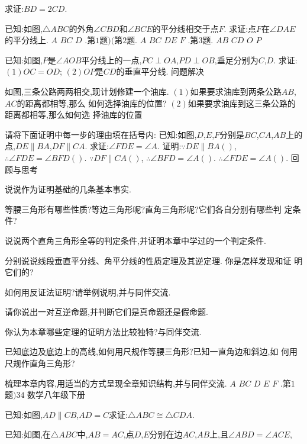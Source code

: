 \documentclass[cn,blue,12pt]{elegantbook}
\begin{document}
\begin{liti}[resume]
求证:\( BD = 2CD\). 
\item 已知:如图,\( \triangle ABC \)的外角\( \angle  CBD \)和\( \angle  BCE \)的平分线相交于点\( F\). 
求证:点\( F \)在\( \angle  DAE \)的平分线上. 
\(A\)
\(B C\)
\(D\)
.第\( 1 \)题\() ( \)第\( 2 \)题.
\(A\)
\(B C\)
\(D E\)
\(F\)
.第\( 3 \)题.
\(A B\)
\(C D\)
\(O\)
\(P\)
\item 已知:如图,\( P \)是\( \angle  AOB \)平分线上的一点,\( PC \perp OA\),\( PD \perp OB\),垂足分别为\( C\),\( D\). 
求证:
\(( 1) OC = OD\);
\(( 2) OP \)是\( CD \)的垂直平分线. 
问题解决
\item 如图,三条公路两两相交,现计划修建一个油库. 
\(( 1) \)如果要求油库到两条公路\( AB\),\( AC \)的距离都相等,那么
如何选择油库的位置?
\(( 2) \)如果要求油库到这三条公路的距离都相等,那么如何选
择油库的位置
\item 请将下面证明中每一步的理由填在括号内:
已知:如图,\( D\),\( E\),\( F \)分别是\( BC\),\( CA\),\( AB \)上的点,\( DE \parallel BA\),\( DF \parallel CA\). 
求证:\( \angle  FDE = \angle  A\). 
证明:\( \because DE \parallel BA( )\),
\( \therefore \angle  FDE = \angle  BFD( ) \). 
\( \because DF \parallel CA( )\),
\( \therefore \angle  BFD = \angle  A( ) \). 
\( \therefore \angle  FDE = \angle  A( ) \). 
回顾与思考
\item 说说作为证明基础的几条基本事实. 
\item 等腰三角形有哪些性质?等边三角形呢?直角三角形呢?它们各自分别有哪些判
定条件?
\item 说说两个直角三角形全等的判定条件,并证明本章中学过的一个判定条件. 
\item 分别说说线段垂直平分线、角平分线的性质定理及其逆定理. 你是怎样发现和证
明它们的?
\item 如何用反证法证明?请举例说明,并与同伴交流. 
\item 请你说出一对互逆命题,并判断它们是真命题还是假命题. 
\item 你认为本章哪些定理的证明方法比较独特?与同伴交流. 
\item 已知底边及底边上的高线,如何用尺规作等腰三角形?已知一直角边和斜边,如
何用尺规作直角三角形?
\item 梳理本章内容,用适当的方式呈现全章知识结构,并与同伴交流. 
\(A\)
\(B C\)
\(D\)
\(E\)
\(F\)
.第\( 1 \)题\()34\)
数学\(  \)八年级\(  \)下册
\item 已知:如图,\( AD \parallel CB\),\( AD = C \)\task 求证:\( \triangle ABC \cong  \triangle CDA\). 
\item 已知:如图,在\( \triangle ABC\)中,\( AB = AC\),点\(D\),\( E\)分别在边\(AC\),\( AB\)上,且\( \angle  ABD = \angle  ACE\),

\end{liti}
\end{document}
